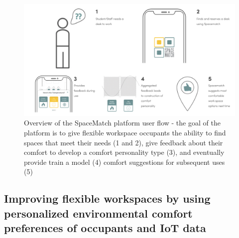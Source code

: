 \documentclass[]{interact}
\theoremstyle{plain}%
\theoremstyle{definition}
\theoremstyle{remark}
\begin{document}
\begin{figure}[ht!]
\centering
\includegraphics[scale=0.27]{figures/UserFLow.png}
\caption{Overview of the SpaceMatch platform user flow - the goal of the platform is to give flexible workspace occupants the ability to find spaces that meet their needs (1 and 2), give feedback about their comfort to develop a comfort personality type (3), and eventually provide train a model (4) comfort suggestions for subsequent uses (5)} 
\label{userflow}
\end{figure}


\subsection{Improving flexible workspaces by using personalized environmental comfort preferences of occupants and IoT data}
\end{document}
